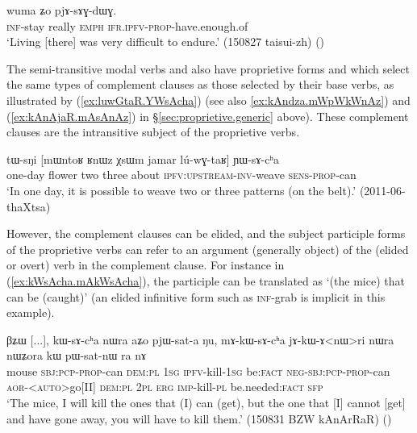\begin{exe}
\ex \label{ex:kArAZi.pjAsAGdWG}
\gll [kɤ-rɤʑi] wuma ʑo pjɤ-sɤɣ-dɯɣ. \\
\textsc{inf}-stay really \textsc{emph} \textsc{ifr}.\textsc{ipfv}-\textsc{prop}-have.enough.of \\
\glt `Living [there] was very difficult to endure.' (150827 taisui-zh) ()
\end{exe}

The semi-transitive modal verbs  and  also have proprietive forms      and  which select  the same types of complement clauses as those selected by their base verbs, as illustrated by (\ref{ex:luwGtaR.YWsAcha}) (see also \ref{ex:kAndza.mWpWkWnAz}) and (\ref{ex:kAnAjaR.mAsAnAz}) in §\ref{sec:proprietive.generic} above). These complement clauses are the intransitive subject of the proprietive verbs.
  
\begin{exe}
\ex \label{ex:luwGtaR.YWsAcha}
\gll  tɯ-sŋi [mɯntoʁ ʁnɯz χsɯm jamar lú-wɣ-taʁ] ɲɯ-sɤ-cʰa \\
one-day flower two three about \textsc{ipfv}:\textsc{upstream}-\textsc{inv}-weave  \textsc{sens}-\textsc{prop}-can \\
\glt `In one day, it is possible to weave two or three patterns (on the belt).' (2011-06-thaXtsa)
\end{exe}

However, the complement clauses can be elided, and the subject participle forms of the proprietive verbs can refer to an argument (generally object) of the  (elided or overt) verb in the complement clause. For instance in (\ref{ex:kWsAcha.mAkWsAcha}), the participle  can be translated as `(the mice) that can be (caught)' (an elided infinitive form such as  \textsc{inf}-grab is implicit in this example).

\begin{exe}
\ex \label{ex:kWsAcha.mAkWsAcha}
\gll βʑɯ [...], kɯ-sɤ-cʰa nɯra aʑo pjɯ-sat-a ŋu, mɤ-kɯ-sɤ-cʰa jɤ-kɯ-ɤ<nɯ>ri nɯra nɯʑora kɯ pɯ-sat-nɯ ra nɤ \\
mouse {   } \textsc{sbj}:\textsc{pcp}-\textsc{prop}-can \textsc{dem}:\textsc{pl} \textsc{1sg} \textsc{ipfv}-kill-\textsc{1sg} be:\textsc{fact} \textsc{neg}-\textsc{sbj}:\textsc{pcp}-\textsc{prop}-can \textsc{aor}-<\textsc{auto}>go[II] \textsc{dem}:\textsc{pl} \textsc{2pl} \textsc{erg} \textsc{imp}-kill-\textsc{pl} be.needed:\textsc{fact} \textsc{sfp} \\
\glt `The mice, I will kill the ones that (I) can (get), but the one that [I] cannot [get] and have gone away, you will have to kill them.' (150831 BZW kAnArRaR)
()
\end{exe}

